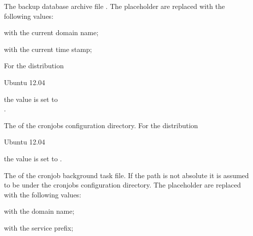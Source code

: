 
The backup database archive file .
The placeholder are replaced with the following values:

\begin{compactitem}
\item {} with the current domain name;
\item {} with the current time stamp;
\end{compactitem}

For the distribution
\begin{inparaitem}
\item[\TheDistribution{ubuntu}] Ubuntu 12.04
\end{inparaitem}
the value is set to \\
.


The  of the cronjobs configuration directory.
For the distribution
\begin{inparaitem}
\item[\TheDistribution{ubuntu}] Ubuntu 12.04
\end{inparaitem}
the value is set to .


The  of the cronjob background task file. If the path is not 
absolute it is assumed to be under the cronjobs configuration directory.
The placeholder are replaced with the following values:

\begin{compactitem}
\item {} with the domain name;
\item {} with the service prefix;
\end{compactitem}

